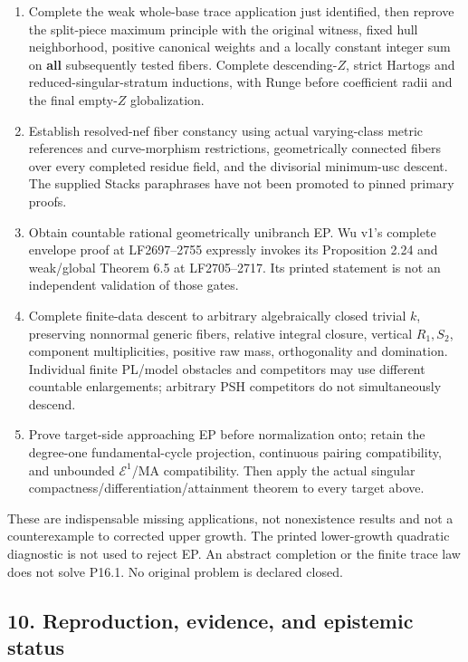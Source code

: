 \documentclass[
  10pt,
]{article}
\providecommand{\tightlist}{%
  \setlength{\itemsep}{0pt}\setlength{\parskip}{0pt}}
\begin{document}
\begin{enumerate}
\def\labelenumi{\arabic{enumi}.}
\tightlist
\item
  Complete the weak whole-base trace application just identified, then
  reprove the split-piece maximum principle with the original witness,
  fixed hull neighborhood, positive canonical weights and a locally
  constant integer sum on \textbf{all} subsequently tested fibers.
  Complete descending-\(Z\), strict Hartogs and reduced-singular-stratum
  inductions, with Runge before coefficient radii and the final
  empty-\(Z\) globalization.
\item
  Establish resolved-nef fiber constancy using actual varying-class
  metric references and curve-morphism restrictions, geometrically
  connected fibers over every completed residue field, and the
  divisorial minimum-usc descent. The supplied Stacks paraphrases have
  not been promoted to pinned primary proofs.
\item
  Obtain countable rational geometrically unibranch EP. Wu v1's complete
  envelope proof at LF2697--2755 expressly invokes its Proposition 2.24
  and weak/global Theorem 6.5 at LF2705--2717. Its printed statement is
  not an independent validation of those gates.
\item
  Complete finite-data descent to arbitrary algebraically closed trivial
  \(k\), preserving nonnormal generic fibers, relative integral closure,
  vertical \(R_1,S_2\), component multiplicities, positive raw mass,
  orthogonality and domination. Individual finite PL/model obstacles and
  competitors may use different countable enlargements; arbitrary PSH
  competitors do not simultaneously descend.
\item
  Prove target-side approaching EP before normalization onto; retain the
  degree-one fundamental-cycle projection, continuous pairing
  compatibility, and unbounded \(\mathcal E^1\)/MA compatibility. Then
  apply the actual singular compactness/differentiation/attainment
  theorem to every target above.
\end{enumerate}

These are indispensable missing applications, not nonexistence results
and not a counterexample to corrected upper growth. The printed
lower-growth quadratic diagnostic is not used to reject EP. An abstract
completion or the finite trace law does not solve P16.1. No original
problem is declared closed.

\subsection{10. Reproduction, evidence, and epistemic
status}\label{reproduction-evidence-and-epistemic-status}
\end{document}
